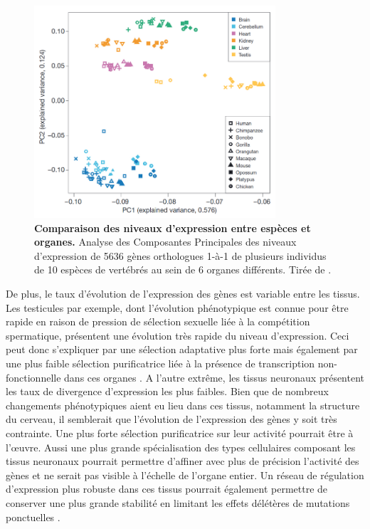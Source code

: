 \begin{figure}[h]
    \centering
    \includegraphics[width=0.8\textwidth, page=1] {figures/introduction/fig28.png}
    \caption[Comparaison des niveaux d'expression entre espèces et organes.]{
    \textbf{Comparaison des niveaux d'expression entre espèces et organes.}
    Analyse des Composantes Principales des niveaux d'expression de 5636 gènes orthologues 1-à-1 de plusieurs individus de 10 espèces de vertébrés au sein de 6 organes différents.
    Tirée de \citep{brawand_evolution_2011}.\\
    }
    \label{fig:Fig28}
\end{figure}

De plus, le taux d’évolution de l’expression des gènes est variable entre les tissus. Les testicules par exemple, dont l’évolution phénotypique est connue pour être rapide en raison de pression de sélection sexuelle liée à la compétition spermatique, présentent une évolution très rapide du niveau d’expression. Ceci peut donc s’expliquer par une sélection adaptative plus forte mais également par une plus faible sélection purificatrice liée à la présence de transcription non-fonctionnelle dans ces organes \citep{soumillon_cellular_2013}. A l’autre extrême, les tissus neuronaux présentent les taux de divergence d’expression les plus faibles. Bien que de nombreux changements phénotypiques aient eu lieu dans ces tissus, notamment la structure du cerveau, il semblerait que l’évolution de l’expression des gènes y soit très contrainte. Une plus forte sélection purificatrice sur leur activité pourrait être à l'œuvre. Aussi une plus grande spécialisation des types cellulaires composant les tissus neuronaux pourrait permettre d’affiner avec plus de précision l’activité des gènes et ne serait pas visible à l’échelle de l’organe entier. Un réseau de régulation d’expression plus robuste dans ces tissus pourrait également permettre de conserver une plus grande stabilité en limitant les effets délétères de mutations ponctuelles \citep{khaitovich_evolution_2006}.

